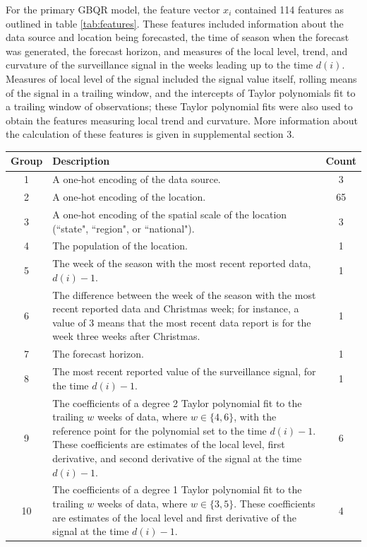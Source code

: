 \documentclass{article}\usepackage[]{graphicx}\usepackage[]{xcolor}
\begin{document}
For the primary GBQR model, the feature vector $x_i$ contained 114 features as outlined in table \ref{tab:features}. These features included information about the data source and location being forecasted, the time of season when the forecast was generated, the forecast horizon, and measures of the local level, trend, and curvature of the surveillance signal in the weeks leading up to the time $d(i)$. Measures of local level of the signal included the signal value itself, rolling means of the signal in a trailing window, and the intercepts of Taylor polynomials fit to a trailing window of observations; these Taylor polynomial fits were also used to obtain the features measuring local trend and curvature. More information about the calculation of these features is given in supplemental section 3.

\begin{table}[htbp]
\centering
\begin{tabular}{cp{11cm}c}
\toprule
Group & \multicolumn{1}{l}{Description} & Count \\
\midrule
1 & A one-hot encoding of the data source. & 3 \\
\midrule
2 & A one-hot encoding of the location. & 65 \\
\midrule
3 & A one-hot encoding of the spatial scale of the location (``state", ``region", or ``national"). & 3 \\
\midrule
4 & The population of the location. & 1 \\
\midrule
5 & The week of the season with the most recent reported data, $d(i) - 1$. & 1 \\
\midrule
6 & The difference between the week of the season with the most recent reported data and Christmas week; for instance, a value of 3 means that the most recent data report is for the week three weeks after Christmas. & 1 \\
\midrule
7 & The forecast horizon. & 1 \\
\midrule
8 & The most recent reported value of the surveillance signal, for the time $d(i) - 1$. & 1 \\
\midrule
9 & The coefficients of a degree 2 Taylor polynomial fit to the trailing $w$ weeks of data, where $w \in \{4, 6\}$, with the reference point for the polynomial set to the time $d(i) - 1$.  These coefficients are estimates of the local level, first derivative, and second derivative of the signal at the time $d(i) - 1$. & 6 \\
\midrule
10 & The coefficients of a degree 1 Taylor polynomial fit to the trailing $w$ weeks of data, where $w \in \{3, 5\}$. These coefficients are estimates of the local level and first derivative of the signal at the time $d(i) - 1$. & 4 \\

\end{tabular}
\end{table}
\end{document}
